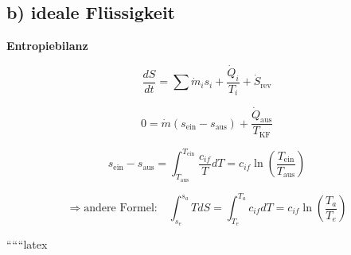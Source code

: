 \subsection*{b) ideale Flüssigkeit}

\textbf{Entropiebilanz}

\[
\frac{dS}{dt} = \sum \dot{m}_i s_i + \frac{\dot{Q}_i}{T_i} + \dot{S}_{\text{rev}}
\]

\[
0 = \dot{m} (s_{\text{ein}} - s_{\text{aus}}) + \frac{\dot{Q}_{\text{aus}}}{T_{\text{KF}}}
\]

\[
s_{\text{ein}} - s_{\text{aus}} = \int_{T_{\text{aus}}}^{T_{\text{ein}}} \frac{c_{if}}{T} dT = c_{if} \ln \left( \frac{T_{\text{ein}}}{T_{\text{aus}}} \right)
\]

\[
\Rightarrow \text{andere Formel:} \quad \int_{s_e}^{s_a} T dS = \int_{T_e}^{T_a} c_{if} dT = c_{if} \ln \left( \frac{T_a}{T_e} \right)
\]

``````latex